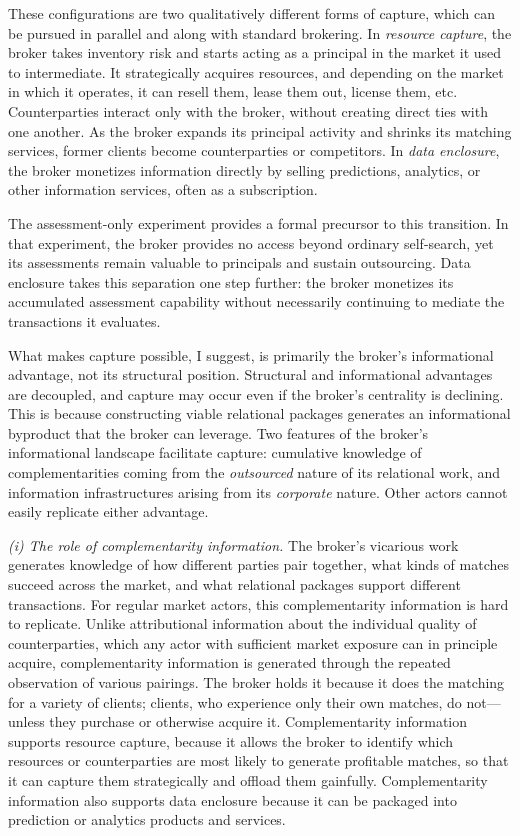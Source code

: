 \documentclass[
]{article}
\begin{document}
These configurations are two qualitatively different forms of capture, which can be pursued in parallel and along with standard brokering. In \emph{resource capture}, the broker takes inventory risk and starts acting as a principal in the market it used to intermediate. It strategically acquires resources, and depending on the market in which it operates, it can resell them, lease them out, license them, etc. Counterparties interact only with the broker, without creating direct ties with one another. As the broker expands its principal activity and shrinks its matching services, former clients become counterparties or competitors. In \emph{data enclosure}, the broker monetizes information directly by selling predictions, analytics, or other information services, often as a subscription.

The assessment-only experiment provides a formal precursor to this transition. In that experiment, the broker provides no access beyond ordinary self-search, yet its assessments remain valuable to principals and sustain outsourcing. Data enclosure takes this separation one step further: the broker monetizes its accumulated assessment capability without necessarily continuing to mediate the transactions it evaluates.

What makes capture possible, I suggest, is primarily the broker's informational advantage, not its structural position. Structural and informational advantages are decoupled, and capture may occur even if the broker's centrality is declining. This is because constructing viable relational packages generates an informational byproduct that the broker can leverage. Two features of the broker's informational landscape facilitate capture: cumulative knowledge of complementarities coming from the \emph{outsourced} nature of its relational work, and information infrastructures arising from its \emph{corporate} nature. Other actors cannot easily replicate either advantage.

\emph{(i) The role of complementarity information.} The broker's vicarious work generates knowledge of how different parties pair together, what kinds of matches succeed across the market, and what relational packages support different transactions. For regular market actors, this complementarity information is hard to replicate. Unlike attributional information about the individual quality of counterparties, which any actor with sufficient market exposure can in principle acquire, complementarity information is generated through the repeated observation of various pairings. The broker holds it because it does the matching for a variety of clients; clients, who experience only their own matches, do not---unless they purchase or otherwise acquire it. Complementarity information supports resource capture, because it allows the broker to identify which resources or counterparties are most likely to generate profitable matches, so that it can capture them strategically and offload them gainfully. Complementarity information also supports data enclosure because it can be packaged into prediction or analytics products and services.
\end{document}
